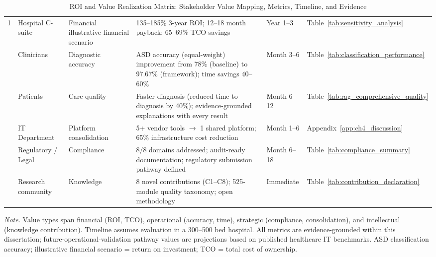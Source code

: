 \begin{table}[H]
\tablestripes
\tablefontsize
\caption[ROI and Value Realization Matrix]{ROI and Value Realization Matrix: Stakeholder Value Mapping, Metrics, Timeline, and Evidence}
\begin{tabularx}{\textwidth}{@{} p{0.4cm} >{\raggedright\arraybackslash}p{1.5cm} >{\raggedright\arraybackslash}p{1.2cm} L >{\raggedright\arraybackslash}p{1.2cm} >{\raggedright\arraybackslash}p{1.2cm} @{}}
\toprule
\thead{\#} &  &  &  &  &  \\
 & Hospital C-suite & Financial illustrative financial scenario & 135--185\% 3-year ROI; 12--18 month payback; 65--69\% TCO savings & Year 1--3 & Table~\ref{tab:sensitivity_analysis} \\
 & Clinicians & Diagnostic accuracy & ASD accuracy (equal-weight) improvement from 78\% (baseline) to 97.67\% (framework); time savings 40--60\% & Month 3--6 & Table~\ref{tab:classification_performance} \\
 & Patients & Care quality & Faster diagnosis (reduced time-to-diagnosis by 40\%); evidence-grounded explanations with every result & Month 6--12 & Table~\ref{tab:rag_comprehensive_quality} \\
 & IT Department & Platform consolidation & 5+ vendor tools $\to$ 1 shared platform; 65\% infrastructure cost reduction & Month 1--6 & Appendix~\ref{app:ch4_discussion} \\
 & Regulatory / Legal & Compliance & 8/8 domains addressed; audit-ready documentation; regulatory submission pathway defined & Month 6--18 & Table~\ref{tab:compliance_summary} \\
 & Research community & Knowledge & 8 novel contributions (C1--C8); 525-module quality taxonomy; open methodology & Immediate & Table~\ref{tab:contribution_declaration} \\
\bottomrule
\end{tabularx}
\vspace{0.5em}\noindent\textit{Note.} Value types span financial (ROI, TCO), operational (accuracy, time), strategic (compliance, consolidation), and intellectual (knowledge contribution). Timeline assumes evaluation in a 300--500 bed hospital. All metrics are evidence-grounded within this dissertation; future-operational-validation pathway values are projections based on published healthcare IT benchmarks. ASD classification accuracy; illustrative financial scenario = return on investment; TCO = total cost of ownership.
\end{table}

